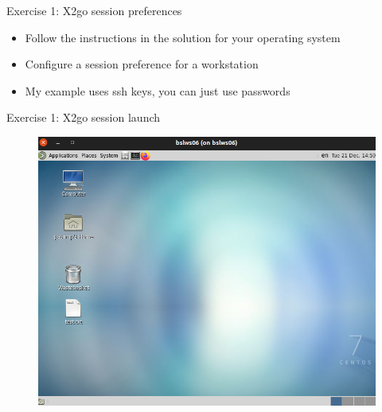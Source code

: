 \documentclass[handout]{beamer} %
\begin{document}
{\begin{frame}{Exercise 1: X2go session preferences }
\begin{minipage}{0.5\textwidth}
\begin{figure}[H]
\end{figure}
\end{minipage} \hfill
\begin{minipage}{0.35\textwidth}
\begin{itemize}
\item Follow the instructions in the solution for your operating system
\item Configure a session preference for a workstation
\item My example uses ssh keys, you can just use passwords
\end{itemize}
\end{minipage}
\end{frame}
}

{
%
\begin{frame}{Exercise 1: X2go session launch }
\begin{minipage}{0.5\textwidth}
\begin{figure}[H]
\includegraphics[scale=0.25]{x2go-bslws06-mate}

\end{figure}
\end{minipage}
\end{frame}}
\end{document}

